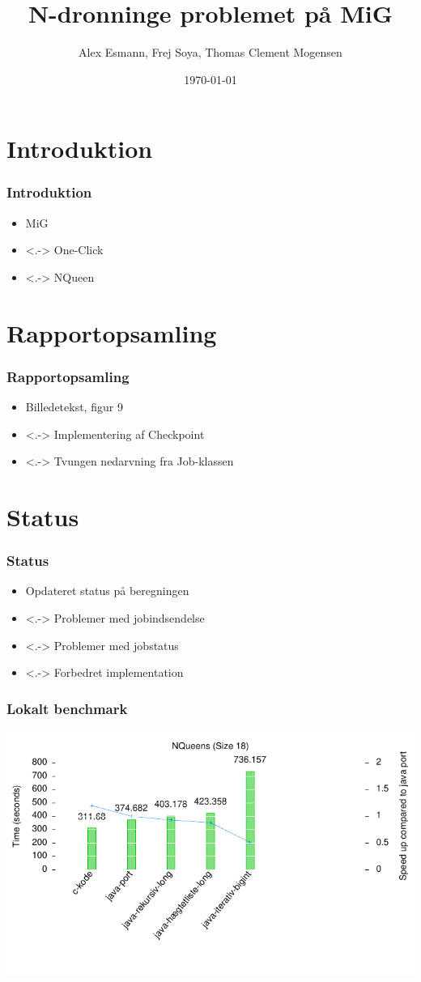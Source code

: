 \documentclass{beamer}
\title{N-dronninge problemet på MiG}
\author{Alex Esmann, Frej Soya, Thomas Clement Mogensen}
\date{\today}
\begin{document}
\frame{\titlepage}
\section{Introduktion}
\frame
{
	\frametitle{Introduktion}

	\begin{itemize}
	\item<1-> MiG
	\item<.-> One-Click
	\item<.-> NQueen
	\end{itemize}
}


\section{Rapportopsamling}
\frame
{
  \frametitle{Rapportopsamling}

  \begin{itemize}
  \item<1-> Billedetekst, figur 9
  \item<.-> Implementering af Checkpoint 
  \item<.-> Tvungen nedarvning fra Job-klassen
  \end{itemize}
}

\section{Status}
\frame
{
  \frametitle{Status}

  \begin{itemize}
  \item<1-> Opdateret status på beregningen
  \item<.-> Problemer med jobindsendelse
  \item<.-> Problemer med jobstatus
  \item<.-> Forbedret implementation
  \end{itemize}
  
  
}

\frame
{
  \frametitle{Lokalt benchmark}
  \includegraphics{../benchmarks/lokal2.pdf}   
  
}
\end{document}
